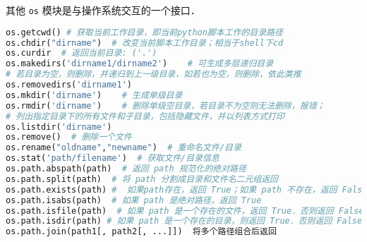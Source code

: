 其他
\verb|os| 模块是与操作系统交互的一个接口．
\begin{lstlisting}[language=python]
os.getcwd() # 获取当前工作目录，即当前python脚本工作的目录路径
os.chdir("dirname")  # 改变当前脚本工作目录；相当于shell下cd
os.curdir  # 返回当前目录: ('.')
os.makedirs('dirname1/dirname2')    # 可生成多层递归目录
# 若目录为空，则删除，并递归到上一级目录，如若也为空，则删除，依此类推
os.removedirs('dirname1')
os.mkdir('dirname')    # 生成单级目录
os.rmdir('dirname')    # 删除单级空目录，若目录不为空则无法删除，报错；
# 列出指定目录下的所有文件和子目录，包括隐藏文件，并以列表方式打印
os.listdir('dirname')
os.remove()  # 删除一个文件
os.rename("oldname","newname")  # 重命名文件/目录
os.stat('path/filename')  # 获取文件/目录信息
os.path.abspath(path)  # 返回 path 规范化的绝对路径
os.path.split(path)  # 将 path 分割成目录和文件名二元组返回
os.path.exists(path) #  如果path存在，返回 True；如果 path 不存在，返回 False
os.path.isabs(path)  # 如果 path 是绝对路径，返回 True
os.path.isfile(path)  # 如果 path 是一个存在的文件，返回 True．否则返回 False
os.path.isdir(path) # 如果 path 是一个存在的目录，则返回 True．否则返回 False
os.path.join(path1[, path2[, ...]])  将多个路径组合后返回
\end{lstlisting}
